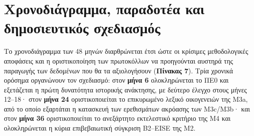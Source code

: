 \documentclass[11pt,a4paper]{article}
\begin{document}
\section{Χρονοδιάγραμμα, παραδοτέα και δημοσιευτικός σχεδιασμός}\label{ux3c7ux3c1ux3bfux3bdux3bfux3b4ux3b9ux3acux3b3ux3c1ux3b1ux3bcux3bcux3b1-ux3c0ux3b1ux3c1ux3b1ux3b4ux3bfux3c4ux3adux3b1-ux3baux3b1ux3b9-ux3b4ux3b7ux3bcux3bfux3c3ux3b9ux3b5ux3c5ux3c4ux3b9ux3baux3ccux3c2-ux3c3ux3c7ux3b5ux3b4ux3b9ux3b1ux3c3ux3bcux3ccux3c2}

Το χρονοδιάγραμμα των 48 μηνών διαρθρώνεται έτσι ώστε οι κρίσιμες μεθοδολογικές αποφάσεις και η οριστικοποίηση των πρωτοκόλλων να προηγούνται αυστηρά της παραγωγής των δεδομένων που θα τα αξιολογήσουν (\textbf{Πίνακας 7}). Τρία χρονικά ορόσημα οργανώνουν τον σχεδιασμό: στον \textbf{μήνα 6} ολοκληρώνεται το ΠΕ0 και εξετάζεται η πρώτη δυνατότητα ιστορικής ανάκτησης, με δεύτερο έλεγχο στους μήνες 12--18· στον \textbf{μήνα 24} οριστικοποιείται το επικυρωμένο λεξικό οικογενειών της Μ3a, από το οποίο εξαρτάται η κατασκευή των ερεθισμάτων ακρόασης των Μ3c/Μ3b· και στον \textbf{μήνα 36} οριστικοποιείται το ανεξάρτητο εκτελεστικό κριτήριο της Μ4 και ολοκληρώνεται η κύρια επιβεβαιωτική σύγκριση B2--EISE της Μ2.
\end{document}
